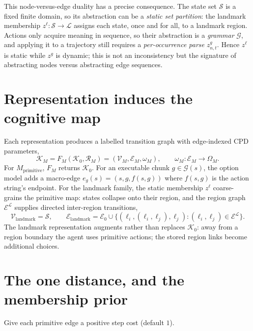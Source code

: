 \documentclass[11pt]{article}
\begin{document}
This node-versus-edge duality has a precise consequence. The state set $\mathcal S$ is a
fixed finite domain, so its abstraction can be a \emph{static set partition}: the landmark
membership $z^{\ell}:\mathcal S\to\mathcal L$ assigns each state, once and for all, to a
landmark region. Actions only acquire meaning in sequence, so their abstraction is a
\emph{grammar} $\mathcal G$, and applying it to a trajectory still requires a
\emph{per-occurrence parse} $z^{g}_{n,t}$. Hence $z^{\ell}$ is static while $z^{g}$ is
dynamic; this is not an inconsistency but the signature of abstracting nodes versus
abstracting edge sequences.

\section{Representation induces the cognitive map}

Each representation produces a labelled transition graph with edge-indexed CPD parameters,
\begin{equation}
\mathcal K_M=F_M(\mathcal K_0,\mathcal R_M)=(\mathcal V_M,\mathcal E_M,\omega_M),
\qquad \omega_M:\mathcal E_M\to\Omega_M.
\label{eq:map}
\end{equation}
For $M_{\mathrm{primitive}}$, $F_M$ returns $\mathcal K_0$. For an executable chunk
$g\in\mathcal G(s)$, the option model adds a macro-edge $e_g(s)=(s,g,f(s,g))$ where
$f(s,g)$ is the action string's endpoint. For the landmark family, the static membership
$z^{\ell}$ coarse-grains the primitive map: states collapse onto their region, and the
region graph $\mathcal E^{\mathcal L}$ supplies directed inter-region transitions,
\[
\mathcal V_{\mathrm{landmark}}=\mathcal S,\qquad
\mathcal E_{\mathrm{landmark}}
=\mathcal E_0\cup\bigl\{(\ell_i,(\ell_i,\ell_j),\ell_j):(\ell_i,\ell_j)\in\mathcal E^{\mathcal L}\bigr\}.
\]
The landmark representation augments rather than replaces $\mathcal K_0$: away from a region
boundary the agent uses primitive actions; the stored region links become additional
choices.

\section{The one distance, and the membership prior}
\label{sec:distance}

Give each primitive edge a positive step cost (default $1$).

\begin{center}
\end{center}
\end{document}
